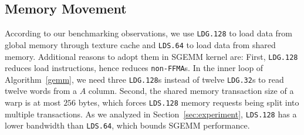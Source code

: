 \subsection{Memory Movement}
According to our benchmarking observations, we use {\tt LDG.128} to load data from global memory through texture cache
and {\tt LDS.64} to load data from shared memory.
Additional reasons to adopt them in SGEMM kernel are:
First, {\tt LDG.128} reduces load instructions, hence reduces {\tt non-FFMA}s. %
In the inner loop of Algorithm~\ref{gemm}, we need three {\tt LDG.128}s instead of twelve {\tt LDG.32}s to read twelve
words from a $A$ column. Second, the shared memory transaction size of a warp is at most
$256$ bytes, which forces {\tt LDS.128} memory requests being split into
multiple transactions.
As we analyzed in Section~\ref{sec:experiment}, {\tt LDS.128} has a lower bandwidth than {\tt LDS.64}, which bounds SGEMM performance.
